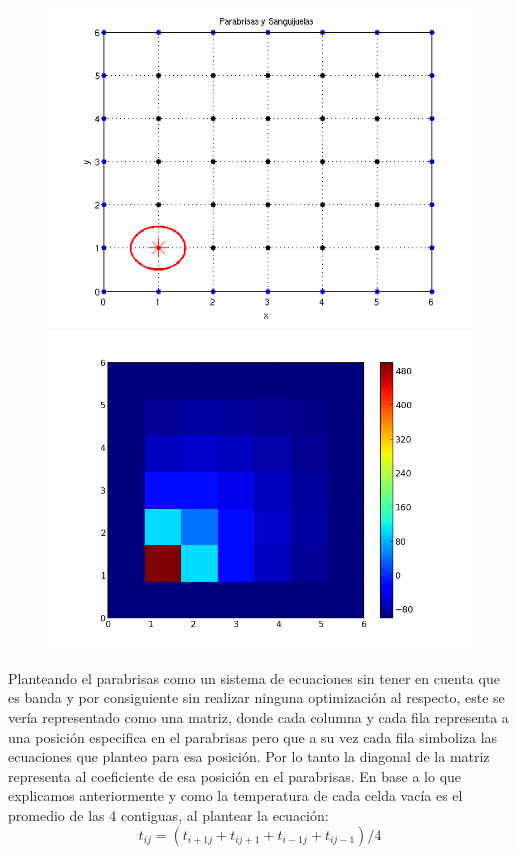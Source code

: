 \begin{figure}[htb]
\begin{center}
\includegraphics[scale=0.40]{imagenes/matrizbandaej_instancia.png} 
\includegraphics[scale=0.40]{imagenes/matrizbandaej_temp.png} 
\end{center}
\end{figure}

\newpage

Planteando el parabrisas como un sistema de ecuaciones sin tener en cuenta que es banda y por consiguiente sin realizar ninguna optimización al respecto, este se vería representado como una matriz, donde cada columna y cada fila representa a una posición especifica en el parabrisas pero que a su vez cada fila simboliza las ecuaciones que planteo para esa posición. Por lo tanto la diagonal de la matriz representa al coeficiente de esa posición en el parabrisas.
En base a lo que explicamos anteriormente y como la temperatura de cada celda vacía es el promedio de las 4 contiguas, al plantear la ecuación: 
\[
t_{ij} = (t_{i+1 j} + t_{i j+1} + t_{i-1 j} + t_{i j-1}) / 4
\]

